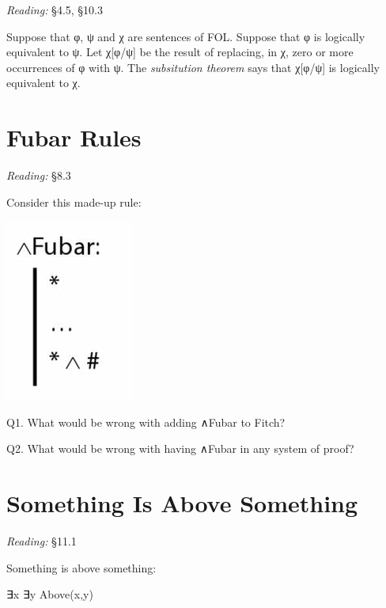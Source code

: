\documentclass[12pt]{extarticle}
\begin{document}
\begin{multicols*}{3}
\emph{Reading:} §4.5, §10.3
 
Suppose that φ, ψ and χ are sentences of FOL. Suppose that φ is logically equivalent to ψ. Let χ[φ/ψ] be the result of replacing, in χ, zero or more occurrences of φ with ψ. The \emph{subsitution theorem} says that χ[φ/ψ] is logically equivalent to χ.
 
 
 
\section{Fubar Rules}
 
\emph{Reading:} §8.3
 
\begin{minipage}{\columnwidth}
 
Consider this made-up rule:
 
\begin{center}
\includegraphics[scale=0.3]{img/fubar_rule.png}
\end{center}
Q1. What would be wrong with adding ∧Fubar to Fitch?
 
Q2. What would be wrong with having ∧Fubar in any system of proof?
 
\end{minipage}
 
 
 
\section{Something Is Above Something}
 
\emph{Reading:} §11.1
 
\begin{minipage}{\columnwidth}
 
Something is above something:
 
∃x ∃y Above(x,y)
 
\end{minipage}
 

\end{multicols*}
\end{document}
